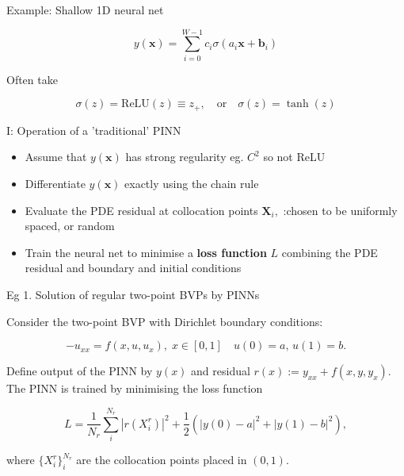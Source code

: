 \documentclass{beamer}
\begin{document}
\begin{frame}

Example: {\color{red} Shallow 1D neural net}

$$y({\mathbf x}) = \sum_{i = 0}^{W-1} c_i \sigma (a_i {\mathbf x} + {\mathbf b}_i)$$

Often take 

$$\sigma(z) = \mbox{ReLU}(z) \equiv z_+, \quad \mbox{or} \quad \sigma(z) = \tanh(z)$$


\end{frame}


\begin{frame}{I: Operation of a 'traditional' PINN}
    
\begin{itemize}

\item Assume that $y({\mathbf x})$ has strong regularity eg. $C^2$ {\color{red} so not ReLU}
\item Differentiate $y({\mathbf x})$ {\color{blue} exactly} using the chain rule
\item Evaluate the {\color{red} PDE residual} at {\color{blue} collocation points} ${\mathbf X}_i,$ :chosen to be uniformly spaced, or {\color{blue} random}
\item Train the neural net to minimise a {\bf loss function} $L$  combining the PDE residual and boundary and initial conditions

\end{itemize}

\end{frame}

\begin{frame}{Eg 1. Solution of regular two-point BVPs by PINNs}


\vspace{1mm}

Consider the two-point BVP with Dirichlet boundary conditions:

{\color{red} $$-u_{xx} = f(x,u,u_x), \;  x \in [0,1] \quad u(0) = a, \, u(1) = b.$$}

Define output of the PINN by $y(x)$ and residual {\color{blue} $r(x) := y_{xx} + f(x,y,y_x)$}. \\
The PINN is trained by minimising the loss function

$$L = \frac{1}{N_{r}} \sum_{i}^{N_{r}} |r(X_{i}^{r})|^{2}  +  \frac{1}{2} \left(|y(0) - a|^{2} + |y(1) - b|^{2}\right), $$

where $\{X_{i}^{r}\}_{i}^{N_{r}}$ are the {\color{blue} collocation points} placed in $(0,1)$.

\end{frame}
\end{document}
